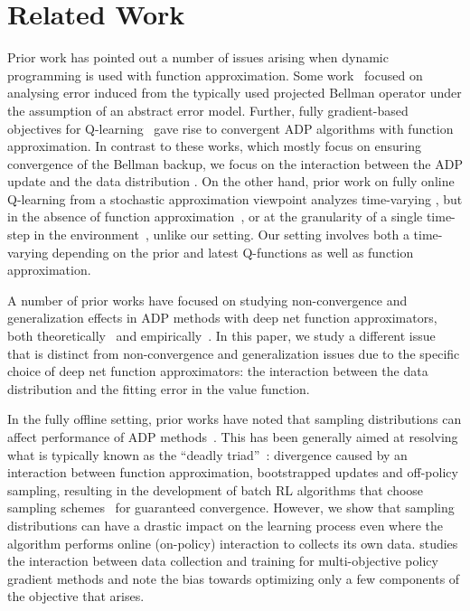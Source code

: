 \documentclass[jmlr]{article}
\begin{document}
 \section{Related Work}
\vspace{-2pt}
Prior work has pointed out a number of issues arising when dynamic programming is used with function approximation. Some work~\citep{munos2005error,farahmand2010error,munos2008finite} focused on analysing error induced from the typically used projected Bellman operator under the assumption of an abstract error model. Further, fully gradient-based objectives for Q-learning~\citep{Sutton09a,Sutton09b,maei09nonlineargtd} gave rise to
convergent ADP algorithms with function approximation. 
In contrast to these works, which mostly focus on ensuring {convergence of the Bellman backup}, we focus on the interaction between the ADP update and the data distribution . 
On the other hand, prior work on fully online Q-learning from a stochastic approximation viewpoint analyzes time-varying , but in the absence of function approximation~\citep{Watkins92,Tsitsiklis1994,devraj2017zap}, or at the granularity of a single time-step in the environment~\citep{Tsitsiklis97ananalysis}, unlike our setting. Our setting involves both a time-varying  depending on the prior and latest Q-functions as well as function approximation.  

A number of prior works have focused on studying non-convergence and generalization effects in ADP methods with deep net function approximators, both theoretically~\citep{Achiam2019TowardsCD} and empirically~\citep{fu19diagnosing,martha2018sparse,kumar19bear}. In this paper, we study a different issue that is distinct from non-convergence and generalization {issues due to the specific choice of deep net function approximators:} the interaction between the data distribution and the fitting error in the value function.


In the fully offline setting, prior works have noted that sampling distributions can affect performance of ADP methods~\citep{fu19diagnosing}. This has been generally aimed at resolving what is typically known as the ``deadly triad''~\citep{suttonrlbook}: {divergence} caused by an interaction between function approximation, bootstrapped updates and off-policy sampling, resulting in the development of batch RL algorithms that choose sampling schemes~\citep{Kolter2011TheFP,sutton16emphatic} {for guaranteed convergence}. However, we show that sampling distributions can have a drastic impact on the learning process even where the algorithm performs online (on-policy) interaction to collects its own data.
\cite{schaul2019ray} studies the interaction between data collection and training for multi-objective policy gradient methods and note the bias towards optimizing only a few components of the objective that arises. 
\end{document}
